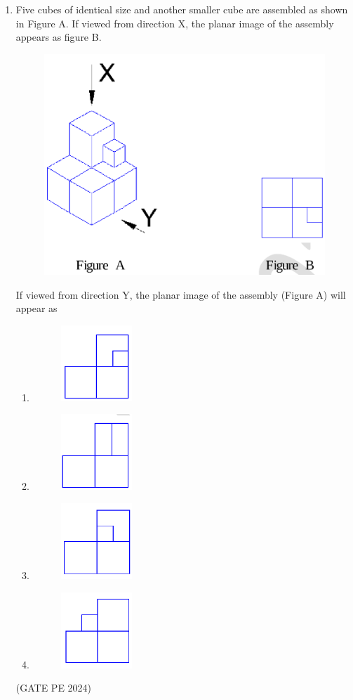 \documentclass[journal,12pt,onecolumn]{IEEEtran}
\theoremstyle{remark}
\begin{document}
\begin{enumerate}
\item Five cubes of identical size and another smaller cube are assembled as shown in Figure A. If viewed from direction X, the planar image of the assembly appears as figure B.
\begin{figure}[H]
    \centering
    \includegraphics[width=0.5\columnwidth]{LQ_9.png}
    \caption{}
    \label{fig:placeholder}
\end{figure}
If viewed from direction Y, the planar image of the assembly (Figure A) will appear as
\begin{enumerate}
    \item \begin{figure}[H]
        \centering
        \includegraphics[width=0.08\columnwidth]{LQ_9a.png}
        \caption{}
        \label{fig:placeholder}
    \end{figure}
    \item \begin{figure}[H]
        \centering
        \includegraphics[width=0.08\columnwidth]{LQ_9b.png}
        \caption{}
        \label{fig:placeholder}
    \end{figure}
    \item \begin{figure}[H]
        \centering
        \includegraphics[width=0.08\columnwidth]{LQ_9c.png}
        \caption{}
        \label{fig:placeholder}
    \end{figure}
    \item \begin{figure}[H]
        \centering
        \includegraphics[width=0.08\columnwidth]{LQ_9d.png}
        \caption{}
        \label{fig:placeholder}
    \end{figure}
\end{enumerate}
\hfill{(GATE PE 2024)}


\end{enumerate}
\end{document}
